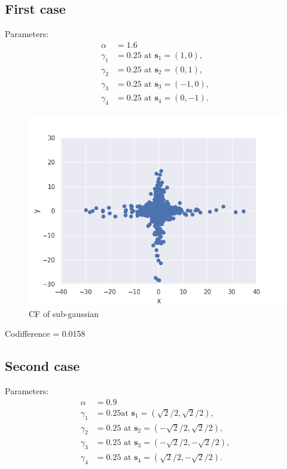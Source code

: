 \documentclass{article}
\begin{document}
	\subsection{First case}
	Parameters:
	$$
	\begin{aligned}
		\alpha &=1.6 \\
		\gamma_1 &=0.25 \text{ at } \mathbf{s}_1=(1,0),\\
		\gamma_2 &=0.25 \text{ at } \mathbf{s}_2=(0,1),\\
		\gamma_3 &=0.25 \text{ at } \mathbf{s}_3=(-1,0),\\
		\gamma_4 &=0.25 \text{ at } \mathbf{s}_4=(0,-1).
	\end{aligned}$$

	\begin{figure}[H]
		\centering
		\includegraphics[width=1\linewidth]{images/ex_5_1_alpha_stable_vector_simulation_discreet_scatter}
		\caption{CF of sub-gaussian}\label{13}
	\end{figure}
	
	Codifference = 0.0158
	
	\subsection{Second case}
	Parameters:
	$$
	\begin{aligned}
		\alpha &=0.9 \\
		\gamma_1 &=0.25 \text {at } \mathbf{s}_1=(\sqrt{2} / 2, \sqrt{2} / 2),\\
		\gamma_2 &=0.25 \text{ at } \mathbf{s}_2=(-\sqrt{2} / 2, \sqrt{2} / 2),\\
		\gamma_3 &=0.25 \text{ at } \mathbf{s}_3=(-\sqrt{2} / 2,-\sqrt{2} / 2),\\
		\gamma_4 &=0.25 \text{ at } \mathbf{s}_4=(\sqrt{2} / 2,-\sqrt{2} / 2).
	\end{aligned}$$
	
\end{document}

